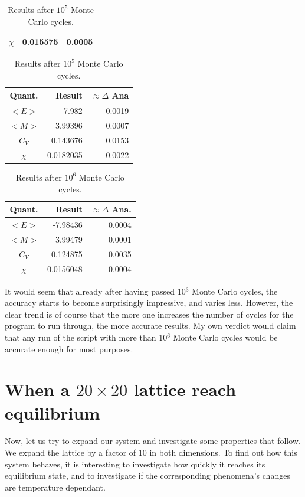 \documentclass[11pt,a4paper,notitlepage,twocolumn]{article}
\begin{document}
\begin{table}[H]
\begin{tabular}{|c|r|r|}
	$\chi$& 0.015575   & 0.0005 \\ \hline
\end{tabular}
\caption{Results after $10^4$ Monte Carlo cycles.}\label{table:4bresults10000}
\begin{tabular}{|c|r|r|}\hline
	Quant.& Result & $\approx\Delta$ Ana\\ \hline
	$<E>$ &-7.982  & 0.0019 \\ \hline
	$<M>$ & 3.99396    & 0.0007 \\ \hline
	$C_V$ & 0.143676   & 0.0153 \\ \hline
	$\chi$& 0.0182035   & 0.0022 \\ \hline
\end{tabular}
\caption{Results after $10^5$ Monte Carlo cycles.}\label{table:4bresults100000}
\end{table}
\begin{table}
[H]\center
\begin{tabular}{|c|r|r|}\hline
	Quant.& Result & $\approx\Delta$ Ana.\\ \hline
	$<E>$ &-7.98436 & 0.0004 \\ \hline
	$<M>$ & 3.99479 & 0.0001 \\ \hline
	$C_V$ & 0.124875 & 0.0035 \\ \hline
	$\chi$& 0.0156048 & 0.0004 \\ \hline
\end{tabular}
\caption{Results after $10^6$ Monte Carlo cycles.}\label{table:4bresults1000000}
\end{table}

It would seem that already after having passed 10$^3$ Monte Carlo cycles, the accuracy starts to become surprisingly impressive, and varies less. However, the clear trend is of course that the more one increases the number of cycles for the program to run through, the more accurate results. My own verdict would claim that any run of the script with more than 10$^6$ Monte Carlo cycles would be accurate enough for most purposes.

\section{When a $20\times20$ lattice reach equilibrium}
Now, let us try to expand our system and investigate some properties that follow. We expand the lattice by a factor of 10 in both dimensions. To find out how this system behaves, it is interesting to investigate how quickly it reaches its equilibrium state, and to investigate if the corresponding phenomena's changes are temperature dependant. 
\end{document}
